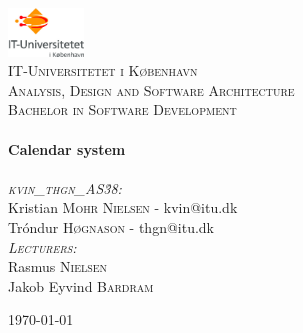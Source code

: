 \begin{titlepage}
\begin{center}

\includegraphics[width=0.15\textwidth]{./logo}~\\[1cm]

\textsc{\LARGE IT-Universitetet i København}\\[1.5cm]

\textsc{\Large Analysis, Design and Software Architecture}\\[0.5cm]
\textsc{Bachelor in Software Development}\\[0.5cm]

\HRule \\[0.4cm]
{ \huge \bfseries Calendar system \\[0.4cm] }
\HRule \\[1.5cm]

\textsc{\LARGE \emph{kvin\_thgn\_AS\.38:}}\\
\vspace{2 mm}
\large
Kristian \textsc{Mohr Nielsen} - kvin@itu.dk\\
Tróndur \textsc{Høgnason} - thgn@itu.dk\\
\vspace{10 mm}
\large
\textsc{\large \emph{Lecturers:}}\\
\vspace{1 mm}
Rasmus \textsc{Nielsen} \\
Jakob Eyvind \textsc{Bardram}

\vfill

{\large \today}
\end{center}
\end{titlepage}